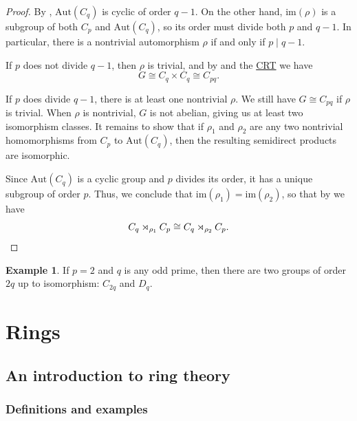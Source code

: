 \documentclass[12pt]{report}
\numberwithin{equation}{section}
\numberwithin{theorem}{chapter}
\theoremstyle{definition}
\newtheorem{example}[theorem]{Example}
\newtheorem*{basic properties}{Basic Properties}
\newtheorem*{Important Remark}{Important Remark}
\def\sdp{\rtimes}
\begin{document}
\begin{proof}
By , $\mathrm{Aut}(C_q)$ is cyclic of order $q-1$. On the other hand, $\mathrm{im}(\rho)$ is a subgroup of both $C_p$ and $\mathrm{Aut}(C_q)$, so its order must divide both $p$ and $q-1$. In particular, there is a nontrivial automorphism $\rho$ if and only if $p \mid q-1$. 

If $p$ does not divide $q-1$, then $\rho$ is trivial, and by  and the \hyperref[CRT]{CRT} we have 
$$G \cong C_q \times C_q \cong C_{pq}.$$

If $p$ does divide $q-1$, there is at least one nontrivial $\rho$.
We still have $G \cong C_{pq}$ if $\rho$ is trivial. When $\rho$ is nontrivial, $G$ is not abelian, giving us at least two isomorphism classes. 
It remains to show that if $\rho_1$ and $\rho_2$ are any two nontrivial homomorphisms from $C_p$ to $\mathrm{Aut}(C_q)$, then the resulting semidirect products are isomorphic.

Since $\mathrm{Aut}(C_q)$ is a cyclic group and $p$ divides its order, it has a unique subgroup of order $p$.
Thus, we conclude that $\mathrm{im}(\rho_1) = \mathrm{im}(\rho_2)$, so that by  we have
$$C_q \sdp_{\rho_1} C_p \cong C_q \sdp_{\rho_2} C_p.\qedhere$$
\end{proof}




\begin{example} 
	If $p =2$ and $q$ is any odd prime, then there are two groups of order $2q$ up to isomorphism: $C_{2q}$ and $D_{q}$.
\end{example}



\part{Rings}

\chapter{An introduction to ring theory}


\section{Definitions and examples}
\end{document}
